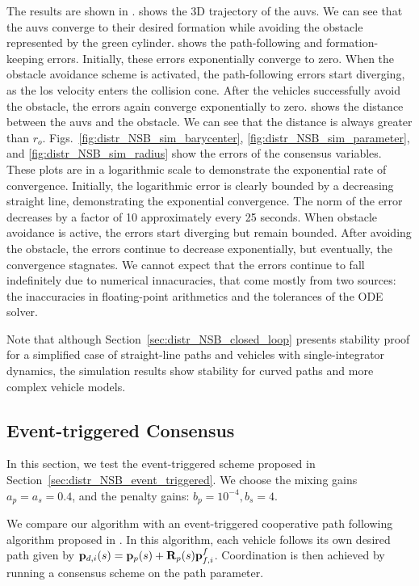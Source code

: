 The results are shown in .
 shows the 3D trajectory of the \glspl{auv}. We can see that the \glspl{auv} converge to their desired formation while avoiding the obstacle represented by the green cylinder.
 shows the path-following and formation-keeping errors. Initially, these errors exponentially converge to zero. When the obstacle avoidance scheme is activated, the path-following errors start diverging, as the \gls{los} velocity enters the collision cone. After the vehicles successfully avoid the obstacle, the errors again converge exponentially to zero.
 shows the distance between the \glspl{auv} and the obstacle. We can see that the distance is always greater than $r_o$.
Figs.~\ref{fig:distr_NSB_sim_barycenter}, \ref{fig:distr_NSB_sim_parameter}, and \ref{fig:distr_NSB_sim_radius} show the errors of the consensus variables. These plots are in a logarithmic scale to demonstrate the exponential rate of convergence. Initially, the logarithmic error is clearly bounded by a decreasing straight line, demonstrating the exponential convergence. The norm of the error decreases by a factor of 10 approximately every 25 seconds. When obstacle avoidance is active, the errors start diverging but remain bounded. After avoiding the obstacle, the errors continue to decrease exponentially, but eventually, the convergence stagnates. We cannot expect that the errors continue to fall indefinitely due to numerical innacuracies, that come mostly from two sources: the inaccuracies in floating-point arithmetics and the tolerances of the ODE solver.

Note that although Section~\ref{sec:distr_NSB_closed_loop} presents stability proof for a simplified case of straight-line paths and vehicles with single-integrator dynamics, the simulation results show stability for curved paths and more complex vehicle models.

\subsection{Event-triggered Consensus}


In this section, we test the event-triggered scheme proposed in Section~\ref{sec:distr_NSB_event_triggered}.
We choose the mixing gains $a_p = a_s = 0.4$, and the penalty gains: $b_p = 10^{-4}, b_s = 4$.

We compare our algorithm with an event-triggered cooperative path following algorithm proposed in \cite{praveen_cooperative_2018}.
In this algorithm, each vehicle follows its own desired path given by $\mathbf{p}_{d,i}(s) = \mathbf{p}_p(s) + \mathbf{R}_p(s) \mathbf{p}_{f, i}^f$.
Coordination is then achieved by running a consensus scheme on the path parameter.

